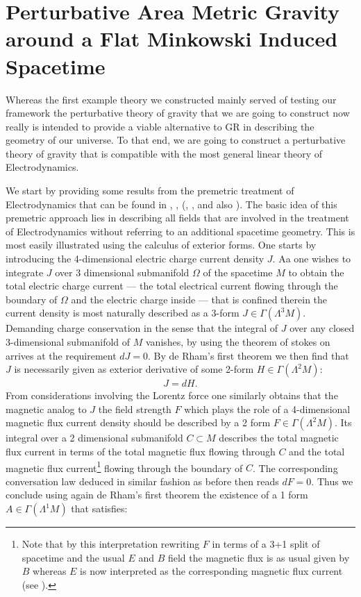 \documentclass[a4paper,12pt, DIV=14, BCOR=5mm, twoside, headsepline, numbers=noenddot]{scrbook}
\begin{document}
\section{Perturbative Area Metric Gravity around a Flat Minkowski Induced Spacetime}
Whereas the first example theory we constructed mainly served of testing our framework the perturbative theory of gravity that we are going to construct now really is intended to provide a viable alternative to GR in describing the geometry of our universe.  
To that end, we are going to construct a perturbative theory of gravity that is compatible with the most general linear theory of Electrodynamics. 

We start by providing some results from the premetric treatment of Electrodynamics that can be found in \cite{1999PhLB..458..466O}, \cite{1999gr.qc....11096H}, (\cite{hehl2003foundations}, \cite{2006physics..10221H}, \cite{2004PhRvD..70j5022L} and also \cite{Hehl2005}). The basic idea of this premetric approach lies in describing all fields that are involved in the treatment of Electrodynamics without referring to an additional spacetime geometry. This is most easily illustrated using the calculus of exterior forms. One starts by introducing the 4-dimensional electric charge current density $J$. Aa one wishes to integrate $J$ over 3 dimensional submanifold $\Omega$ of the spacetime $M$ to obtain the total electric charge current --- the total electrical current flowing through the boundary of $\Omega$ and the electric charge inside --- that is confined therein the current density is most naturally described as a 3-form $J \in \Gamma(\Lambda^3M)$. Demanding charge conservation in the sense that the integral of $J$ over any closed 3-dimensional submanifold of $M$ vanishes, by using the theorem of stokes on arrives at the requirement $dJ =0$. By de Rham's first theorem we then find that $J$ is necessarily given as exterior derivative of some 2-form $H \in \Gamma(\Lambda^2M)$:
\begin{align}
    J = d H.
\end{align}
From considerations involving the Lorentz force one similarly obtains that the magnetic analog to $J$ the field strength $F$ which plays the role of a 4-dimensional magnetic flux current density should be described by a 2 form $F \in \Gamma(\Lambda^2M)$. Its integral over a 2 dimensional submanifold $C \subset M$ describes the total magnetic flux current in terms of the total magnetic flux flowing through $C$ and the total magnetic flux current\footnote{Note that by this interpretation rewriting $F$ in terms of a 3+1 split of spacetime and the usual $E$ and $B$ field the magnetic flux is as usual given by $B$ whereas $E$ is now interpreted as the corresponding magnetic flux current (see \cite{2006physics..10221H}).} flowing through the boundary of $C$. The corresponding conversation law deduced in similar fashion as before then reads $dF =0$. Thus we conclude using again de Rham's first theorem the existence of a 1 form $A \in \Gamma(\Lambda^1M)$ that satisfies:
\end{document}
